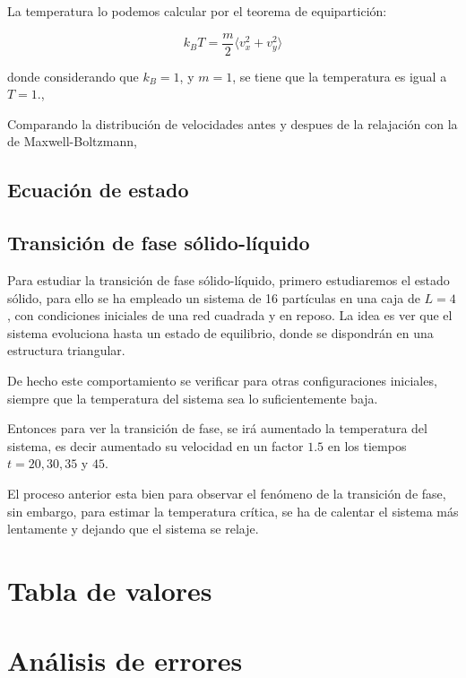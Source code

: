 \documentclass[11pt, twoside]{article} %
\begin{document}
La temperatura lo podemos calcular por el teorema de equipartición:

\begin{equation}
    k_B T = \frac{m}{2}\langle v_x^2 + v_y^2 \rangle
\end{equation}

donde considerando que $k_B =1$, y $m=1$, se tiene que la temperatura es igual a
$T = 1.$, 

Comparando la distribución de velocidades antes y despues de la relajación con la 
de Maxwell-Boltzmann,

\subsection{Ecuación de estado}

\subsection{Transición de fase sólido-líquido}
Para estudiar la transición de fase sólido-líquido, primero estudiaremos el estado
sólido, para ello se ha empleado un sistema de 16 partículas en una caja de 
$L=4$, con condiciones iniciales de una red cuadrada y en reposo. La idea es ver 
que el sistema evoluciona hasta un estado de equilibrio, donde se dispondrán 
en una estructura triangular.


De hecho este comportamiento se verificar para otras configuraciones iniciales, 
siempre que la temperatura del sistema sea lo suficientemente baja.

Entonces para ver la transición de fase, se irá aumentado la temperatura del sistema, 
es decir aumentado su velocidad en un factor $1.5$ en los tiempos 
$t=20, 30, 35$ y $45$.


El proceso anterior esta bien para observar el fenómeno de la transición de fase,
sin embargo, para estimar la temperatura crítica, se ha de calentar el sistema más lentamente
y dejando que el sistema se relaje.


\newpage

\appendix

\section{Tabla de valores}


\newpage

\section{Análisis de errores}
\end{document}
